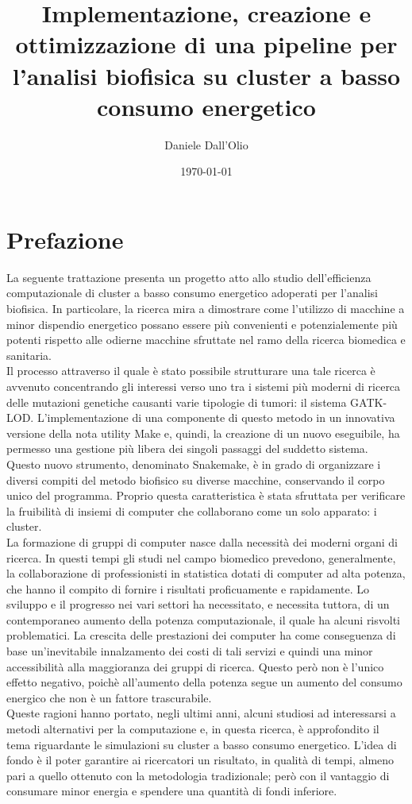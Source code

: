 \documentclass[12pt, a4paper]{report}
\title{Implementazione, creazione e ottimizzazione di una pipeline per l'analisi biofisica su cluster a basso consumo energetico}
\author{Daniele Dall'Olio}
\date{\today}
\begin{document}
\section*{Prefazione}
La seguente trattazione presenta un progetto atto allo studio dell'efficienza computazionale di cluster a basso consumo energetico adoperati per l'analisi biofisica. In particolare, la ricerca mira a dimostrare come l'utilizzo di macchine a minor dispendio energetico possano essere più convenienti e potenzialemente più potenti rispetto alle odierne macchine sfruttate nel ramo della ricerca biomedica e sanitaria. 
\\
Il processo attraverso il quale è stato possibile strutturare una tale ricerca è avvenuto concentrando gli interessi verso uno tra i sistemi più moderni di ricerca delle mutazioni genetiche causanti varie tipologie di tumori: il sistema GATK-LOD.
L'implementazione di una componente di questo metodo in un innovativa versione della nota utility Make e, quindi, la creazione di un nuovo eseguibile, ha permesso una gestione più libera dei singoli passaggi del suddetto sistema. \\
Questo nuovo strumento, denominato Snakemake, è in grado di organizzare i diversi compiti del metodo biofisico su diverse macchine, conservando il corpo unico del programma. Proprio questa caratteristica è stata sfruttata per verificare la fruibilità di insiemi di computer che collaborano come un solo apparato: i cluster. \\
La formazione di gruppi di computer nasce dalla necessità dei moderni organi di ricerca.
In questi tempi gli studi nel campo biomedico prevedono, generalmente, la collaborazione di professionisti in statistica dotati di computer ad alta potenza, che hanno il compito di fornire i risultati proficuamente e rapidamente. Lo sviluppo e il progresso nei vari settori ha necessitato, e necessita tuttora, di un contemporaneo aumento della potenza computazionale, il quale ha alcuni risvolti problematici. La crescita delle prestazioni dei computer ha come conseguenza di base un'inevitabile innalzamento dei costi di tali servizi e quindi una minor accessibilità alla maggioranza dei gruppi di ricerca. Questo però non è l'unico effetto negativo, poichè all'aumento della potenza segue un aumento del consumo energico che non è un fattore trascurabile. \\
Queste ragioni hanno portato, negli ultimi anni, alcuni studiosi ad interessarsi a metodi alternativi per la computazione e, in questa ricerca, è approfondito il tema riguardante le simulazioni su cluster a basso consumo energetico. L'idea di fondo è il poter garantire ai ricercatori un risultato, in qualità di tempi, almeno pari a quello ottenuto con la metodologia tradizionale; però con il vantaggio di consumare minor energia e spendere una quantità di fondi inferiore.
\end{document}
